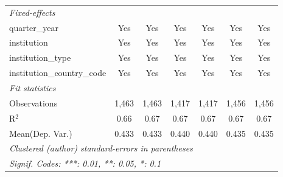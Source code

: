 \begin{tabular}{lcccccc}
   \midrule
   \emph{Fixed-effects}\\
   quarter\_year                      & Yes     & Yes         & Yes     & Yes     & Yes     & Yes\\  
   institution                        & Yes     & Yes         & Yes     & Yes     & Yes     & Yes\\  
   institution\_type                  & Yes     & Yes         & Yes     & Yes     & Yes     & Yes\\  
   institution\_country\_code         & Yes     & Yes         & Yes     & Yes     & Yes     & Yes\\  
   \midrule
   \emph{Fit statistics}\\
   Observations                       & 1,463   & 1,463       & 1,417   & 1,417   & 1,456   & 1,456\\  
   R$^2$                              & 0.66    & 0.67        & 0.67    & 0.67    & 0.67    & 0.67\\  
Mean(Dep. Var.) & 0.433 & 0.433 & 0.440 & 0.440 & 0.435 & 0.435 \\
   \midrule \midrule
   \multicolumn{7}{l}{\emph{Clustered (author) standard-errors in parentheses}}\\
   \multicolumn{7}{l}{\emph{Signif. Codes: ***: 0.01, **: 0.05, *: 0.1}}\\
\end{tabular}
\par\endgroup
